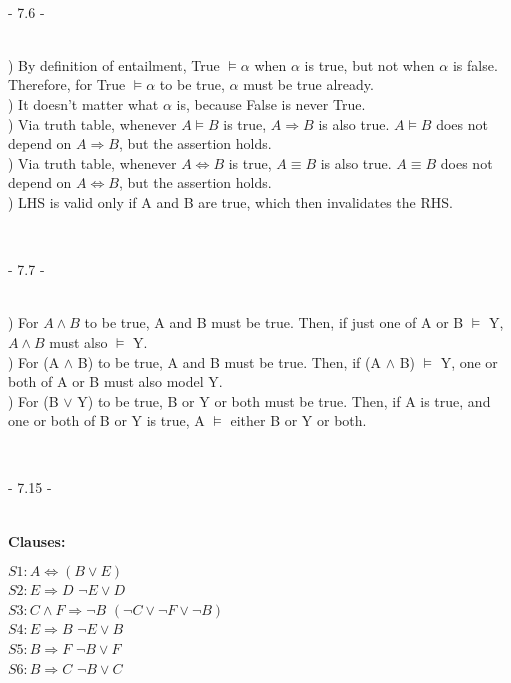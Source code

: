 \documentclass[12pt]{article}
\begin{document}
\noindent \hrulefill \\\pagebreak



\centerline{- 7.6 - }
\ \\
) By definition of entailment, True $\models \alpha$ when $\alpha$ is true, but not when $\alpha$ is false. Therefore, for True $\models \alpha$ to be true, $\alpha$ must be true already.\\[.4em]
) It doesn't matter what $\alpha$ is, because False is never True.\\[.4em]
) Via truth table, whenever $A\models B$ is true, $A\Rightarrow B$ is also true. $A\models B$ does not depend on $A\Rightarrow B$, but the assertion holds.\\[.4em]
) Via truth table, whenever $A\Leftrightarrow B$ is true, $A\equiv B$ is also true. $A\equiv B$ does not depend on $A\Leftrightarrow B$, but the assertion holds.\\[.4em]
) LHS is valid only if A and B are true, which then invalidates the RHS.



\noindent \hrulefill \\



\centerline{- 7.7 - }
\ \\
) For $A \wedge B$ to be true, A and B must be true. Then, if just one of A or B $\models$ Y, $A \wedge B$ must also $\models$ Y. \\[.4em]
) For (A $\wedge$ B) to be true, A and B must be true. Then, if (A $\wedge$ B) $\models$ Y, one or both of A or B must also model Y.\\[.4em]
) For (B $\vee$ Y) to be true, B or Y or both must be true. Then, if A is true, and one or both of B or Y is true, A $\models$ either B or Y or both.



\noindent \hrulefill \\



\centerline{- 7.15 - }
\ \\
\textbf{Clauses:}
\begin{multicols}{2}
\indent $S1: A\Leftrightarrow (B\vee E)$\\
\indent $S2: E\Rightarrow D$ \indent \indent \indent $\neg E \vee D$\\
\indent $S3: C\wedge F\Rightarrow \neg B$ \indent  $(\neg C \vee \neg F \vee \neg B)$
\columnbreak\\
\indent $S4: E\Rightarrow B$ \indent \indent $\neg E \vee B$\\
\indent $S5: B\Rightarrow F$ \indent \indent $\neg B \vee F$\\
\indent $S6: B\Rightarrow C$ \indent \indent $\neg B \vee C$
\end{multicols}
\end{document}
